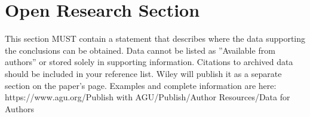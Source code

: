 \documentclass[draft]{agujournal2019}
\begin{document}




%
%

\section*{Open Research Section}
This section MUST contain a statement that describes where the data supporting the conclusions can be obtained. Data cannot be listed as ''Available from authors'' or stored solely in supporting information. Citations to archived data should be included in your reference list. Wiley will publish it as a separate section on the paper’s page. Examples and complete information are here:
https://www.agu.org/Publish with AGU/Publish/Author Resources/Data for Authors
\end{document}
